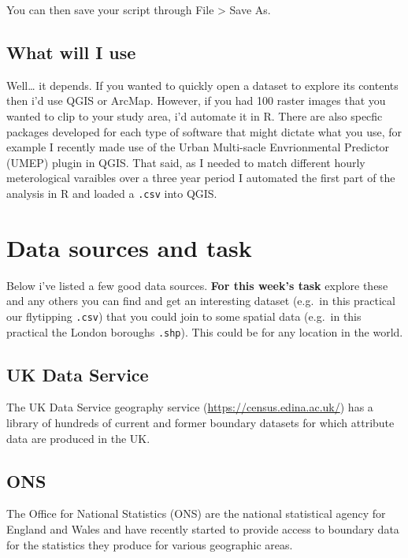 \documentclass[]{book}
\begin{document}
You can then save your script through File \textgreater{} Save As.

\hypertarget{what-will-i-use-1}{%
\subsection{What will I use}\label{what-will-i-use-1}}

Well\ldots{} it depends. If you wanted to quickly open a dataset to explore its contents then i'd use QGIS or ArcMap. However, if you had 100 raster images that you wanted to clip to your study area, i'd automate it in R. There are also specfic packages developed for each type of software that might dictate what you use, for example I recently made use of the Urban Multi-sacle Envrionmental Predictor (UMEP) plugin in QGIS. That said, as I needed to match different hourly meterological varaibles over a three year period I automated the first part of the analysis in R and loaded a \texttt{.csv} into QGIS.

\hypertarget{data-sources-and-task}{%
\section{Data sources and task}\label{data-sources-and-task}}

Below i've listed a few good data sources. \textbf{For this week's task} explore these and any others you can find and get an interesting dataset (e.g.~in this practical our flytipping \texttt{.csv}) that you could join to some spatial data (e.g.~in this practical the London boroughs \texttt{.shp}). This could be for any location in the world.

\hypertarget{uk-data-service}{%
\subsection{UK Data Service}\label{uk-data-service}}

The UK Data Service geography service (\url{https://census.edina.ac.uk/}) has a library of hundreds of current and former boundary datasets for which attribute data are produced in the UK.

\hypertarget{ons}{%
\subsection{ONS}\label{ons}}

The Office for National Statistics (ONS) are the national statistical agency for England and Wales and have recently started to provide access to boundary data for the statistics they produce for various geographic areas.
\end{document}
